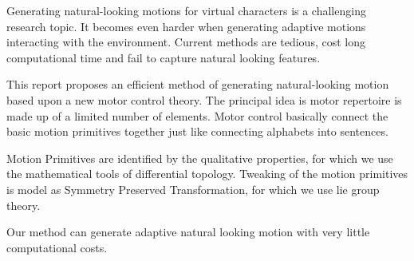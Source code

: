 


\begin{abstracts}        %

Generating natural-looking motions for virtual characters is a challenging research topic.
It becomes even harder when generating adaptive motions interacting with the environment. 
Current methods are tedious, cost long computational time and fail to capture natural looking features.

This report proposes an efficient method of generating natural-looking motion based upon a new motor control theory.
The principal idea is motor repertoire is made up of a limited number of elements. Motor control basically connect the basic motion primitives together just like connecting alphabets into sentences.


Motion Primitives are identified by the qualitative properties, for which we use the mathematical tools of differential topology.
Tweaking of the motion primitives is model as Symmetry Preserved Transformation, for which we use lie group theory.


Our method can generate adaptive natural looking motion with very little computational costs.


\end{abstracts}





